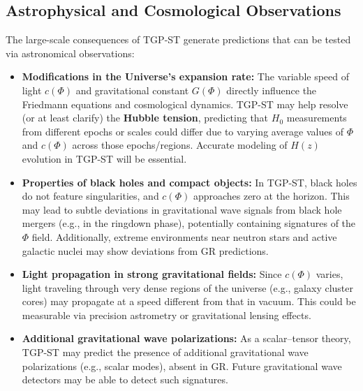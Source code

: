 \documentclass[11pt,a4paper]{article}
\begin{document}
\subsection{Astrophysical and Cosmological Observations}
The large-scale consequences of TGP-ST generate predictions that can be tested via astronomical observations:
\begin{itemize}
    \item \textbf{Modifications in the Universe’s expansion rate:} The variable speed of light $c(\Phi)$ and gravitational constant $G(\Phi)$ directly influence the Friedmann equations and cosmological dynamics. TGP-ST may help resolve (or at least clarify) the \textbf{Hubble tension}, predicting that $H_0$ measurements from different epochs or scales could differ due to varying average values of $\Phi$ and $c(\Phi)$ across those epochs/regions. Accurate modeling of $H(z)$ evolution in TGP-ST will be essential.
    \item \textbf{Properties of black holes and compact objects:} In TGP-ST, black holes do not feature singularities, and $c(\Phi)$ approaches zero at the horizon. This may lead to subtle deviations in gravitational wave signals from black hole mergers (e.g., in the ringdown phase), potentially containing signatures of the $\Phi$ field. Additionally, extreme environments near neutron stars and active galactic nuclei may show deviations from GR predictions.
    \item \textbf{Light propagation in strong gravitational fields:} Since $c(\Phi)$ varies, light traveling through very dense regions of the universe (e.g., galaxy cluster cores) may propagate at a speed different from that in vacuum. This could be measurable via precision astrometry or gravitational lensing effects.
    \item \textbf{Additional gravitational wave polarizations:} As a scalar–tensor theory, TGP-ST may predict the presence of additional gravitational wave polarizations (e.g., scalar modes), absent in GR. Future gravitational wave detectors may be able to detect such signatures.
\end{itemize}
\end{document}
